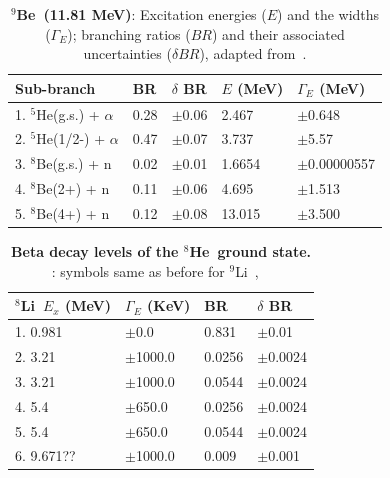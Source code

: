 \documentclass{JINST}
\newcommand{\li}{$^{9}$Li~}
\newcommand{\he}{$^{8}$He~}
\newcommand{\beNINE}{$^{9}$Be~}
\newcommand{\liEIGHT}{$^{8}$Li~}
\begin{document}
\begin{table}[tb]
\label{tab5}
\caption{ {\bf  \beNINE (11.81 MeV)}: Excitation energies ($E$) and the widths
($\Gamma_E$); branching ratios ($BR$) and their associated uncertainties
($\delta BR $), adapted from~\cite{Prezado200355}.}
\begin{center}
\begin{small}
\begin{tabular}{l l l l l}
\hline
\hline
Sub-branch & BR & $\delta$ BR & $E$ (MeV) & $\Gamma_E$ (MeV) \\
\hline
1. $^{5}$He(g.s.) + $\alpha$ & 0.28 & $\pm$0.06 & 2.467 & $\pm$0.648 \\ 
2. $^{5}$He(1/2-) + $\alpha$ & 0.47 & $\pm$0.07 & 3.737 & $\pm$5.57 \\
3. $^{8}$Be(g.s.) + n & 0.02 & $\pm$0.01 & 1.6654 & $\pm$0.00000557 \\
4. $^{8}$Be(2+) + n  & 0.11 & $\pm$0.06 & 4.695 & $\pm$1.513 \\
5. $^{8}$Be(4+) + n & 0.12 & $\pm$0.08  &  13.015 & $\pm$3.500 \\
\hline
\hline
\end{tabular}
\end{small}
\end{center}
\end{table}





\begin{table}[tb]
\caption{\label{tab_he:betaStates} {\bf Beta decay levels of the \he ground state. 
}: symbols same as before for \li, ~\cite{Tilley2004155}}
\begin{center}
\begin{small}
\begin{tabular}{l l l l }
\hline
\hline
\liEIGHT $E_x$ (MeV) & $\Gamma_E$ (KeV)& BR & $\delta$ BR   \\
\hline
1. 0.981 & $\pm$0.0& 0.831 & $\pm$0.01   \\ 
2. 3.21& $\pm$1000.0 & 0.0256 & $\pm$0.0024   \\
3. 3.21  & $\pm$1000.0& 0.0544 & $\pm$0.0024   \\
4. 5.4 & $\pm$650.0 & 0.0256 & $\pm$0.0024   \\
5. 5.4 & $\pm$650.0 & 0.0544 & $\pm$0.0024   \\
6. 9.671?? & $\pm$1000.0 & 0.009 & $\pm$0.001   \\
\hline
\hline
\end{tabular}
\end{small}
\end{center}
\end{table}
\end{document}
